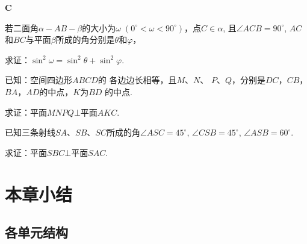\begin{center}
    \bfseries C
\end{center}
\begin{enumerate}\setcounter{enumi}{15}
\item 若二面角$\alpha-AB-\beta$的大小为$\omega \; (0^{\circ}<\omega<90^{\circ})$，点$C\in\alpha$, 且$\angle ACB=90^{\circ}$, $AC$和$BC$与平面$\beta$所成的角分别是$\theta$和$\varphi$，

求证：$\sin^2\omega =\sin^2\theta+\sin^2\varphi$.

\noindent
\begin{minipage}{.45\textwidth}
    \item 已知：空间四边形$ABCD$的
    各边边长相等，且$M$、$N$、
    $P$、$Q$，分别是$DC$，$CB$，
    $BA$，$AD$的中点，$K$为$BD$
    的中点.
    
    求证：平面$MNPQ\bot $平面$AKC$.

\item 已知三条射线$SA$、$SB$、$SC$所成的角$\angle ASC=45^{\circ}$, $\angle CSB=45^{\circ}$, $\angle ASB=60^{\circ}$. 

求证：平面$SBC\bot $平面$SAC$.
\end{minipage}
\hfill
\begin{minipage}{.45\textwidth}
\centering
{}
\end{minipage}
\end{enumerate}

\section{本章小结}

\subsection{各单元结构}

